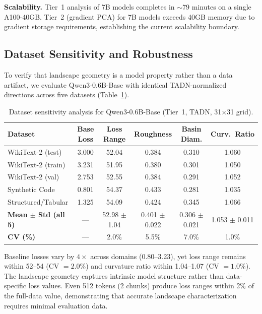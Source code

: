 \documentclass{article}
\begin{document}
\textbf{Scalability.} Tier~1 analysis of 7B models completes in $\sim$79 minutes on a single A100-40GB. Tier~2 (gradient PCA) for 7B models exceeds 40GB memory due to gradient storage requirements, establishing the current scalability boundary.

\subsection{Dataset Sensitivity and Robustness}
\label{sec:dataset}

To verify that landscape geometry is a model property rather than a data artifact, we evaluate Qwen3-0.6B-Base with identical TADN-normalized directions across five datasets (Table~\ref{tab:dataset}).

\begin{table}[t]
\centering
\caption{Dataset sensitivity analysis for Qwen3-0.6B-Base (Tier~1, TADN, 31$\times$31 grid).}
\label{tab:dataset}
\small
\begin{tabular}{lccccc}
\toprule
\textbf{Dataset} & \textbf{Base Loss} & \textbf{Loss Range} & \textbf{Roughness} & \textbf{Basin Diam.} & \textbf{Curv.\ Ratio} \\
\midrule
WikiText-2 (test) & 3.000 & 52.04 & 0.384 & 0.310 & 1.060 \\
WikiText-2 (train) & 3.231 & 51.95 & 0.380 & 0.301 & 1.050 \\
WikiText-2 (val) & 2.753 & 52.55 & 0.384 & 0.291 & 1.052 \\
Synthetic Code & 0.801 & 54.37 & 0.433 & 0.281 & 1.035 \\
Structured/Tabular & 1.325 & 54.09 & 0.424 & 0.345 & 1.066 \\
\midrule
\textbf{Mean $\pm$ Std (all 5)} & --- & 52.98 $\pm$ 1.04 & 0.401 $\pm$ 0.022 & 0.306 $\pm$ 0.021 & 1.053 $\pm$ 0.011 \\
\textbf{CV (\%)} & --- & 2.0\% & 5.5\% & 7.0\% & 1.0\% \\
\bottomrule
\end{tabular}
\end{table}

Baseline losses vary by $4\times$ across domains (0.80--3.23), yet loss range remains within 52--54 (CV $= 2.0\%$) and curvature ratio within 1.04--1.07 (CV $= 1.0\%$). The landscape geometry captures intrinsic model structure rather than data-specific loss values. Even 512 tokens (2 chunks) produce loss ranges within 2\% of the full-data value, demonstrating that accurate landscape characterization requires minimal evaluation data.
\end{document}
